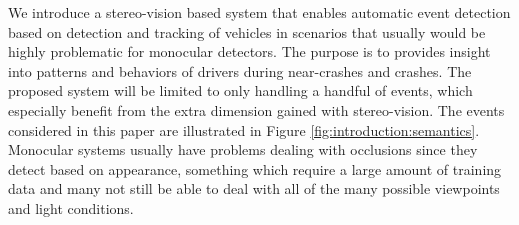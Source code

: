 We introduce a stereo-vision based system that enables automatic event detection based on detection and tracking of vehicles in scenarios that usually would be highly problematic for monocular detectors. The purpose is to provides insight into patterns and behaviors of drivers during near-crashes and crashes. The proposed system will be limited to only handling a handful of events, which especially benefit from the extra dimension gained with stereo-vision. The events considered in this paper are illustrated in Figure \ref{fig:introduction:semantics}. Monocular systems usually have problems dealing with occlusions since they detect based on appearance, something which require a large amount of training data and many not still be able to deal with all of the many possible viewpoints and light conditions. 
\vspace*{-3mm}
